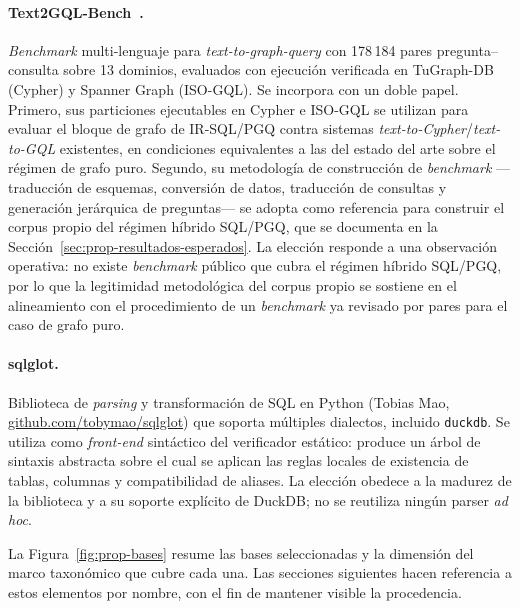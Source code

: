 \paragraph{Text2GQL-Bench~\cite{text2gqlbench}.} \emph{Benchmark} multi-lenguaje para \emph{text-to-graph-query} con 178\,184 pares pregunta--consulta sobre 13 dominios, evaluados con ejecución verificada en TuGraph-DB (Cypher) y Spanner Graph (ISO-GQL). Se incorpora con un doble papel. Primero, sus particiones ejecutables en Cypher e ISO-GQL se utilizan para evaluar el bloque de grafo de IR-SQL/PGQ contra sistemas \emph{text-to-Cypher}/\emph{text-to-GQL} existentes, en condiciones equivalentes a las del estado del arte sobre el régimen de grafo puro. Segundo, su metodología de construcción de \emph{benchmark} ---traducción de esquemas, conversión de datos, traducción de consultas y generación jerárquica de preguntas--- se adopta como referencia para construir el corpus propio del régimen híbrido \ac{SQL}/\ac{PGQ}, que se documenta en la Sección~\ref{sec:prop-resultados-esperados}. La elección responde a una observación operativa: no existe \emph{benchmark} público que cubra el régimen híbrido \ac{SQL}/\ac{PGQ}, por lo que la legitimidad metodológica del corpus propio se sostiene en el alineamiento con el procedimiento de un \emph{benchmark} ya revisado por pares para el caso de grafo puro.

\paragraph{sqlglot.}
Biblioteca de \emph{parsing} y transformación de SQL en Python (Tobias Mao, \url{github.com/tobymao/sqlglot}) que soporta múltiples dialectos, incluido \texttt{duckdb}. Se utiliza como \emph{front-end} sintáctico del verificador estático: produce un árbol de sintaxis abstracta sobre el cual se aplican las reglas locales de existencia de tablas, columnas y compatibilidad de aliases. La elección obedece a la madurez de la biblioteca y a su soporte explícito de DuckDB; no se reutiliza ningún parser \emph{ad hoc}.

\medskip

La Figura~\ref{fig:prop-bases} resume las bases seleccionadas y la dimensión del marco taxonómico que cubre cada una. Las secciones siguientes hacen referencia a estos elementos por nombre, con el fin de mantener visible la procedencia.

